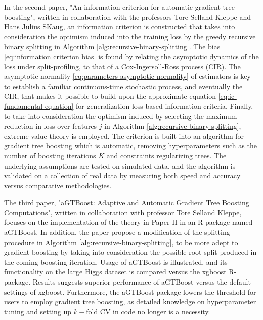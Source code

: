 In the second paper, "An information criterion for automatic gradient tree boosting", written in collaboration with the professors Tore Selland Kleppe and Hans Julius SKaug, an information criterion is constructed that takes into consideration the optimism induced into the training loss by the greedy recursive binary splitting in Algorithm \ref{alg:recursive-binary-splitting}.
The bias \eqref{eq:information criterion bias} is found by relating the asymptotic dynamics of the loss under split-profiling, to that of a Cox-Ingersoll-Ross process (CIR).
The asymptotic normality \eqref{eq:parameters-asymptotic-normality} of estimators is key to establish a familiar continuous-time stochastic process, and eventually the CIR, that makes it possible to build upon the approximate equation \eqref{eq:ic-fundamental-equation} for generalization-loss based information criteria.
Finally, to take into consideration the optimism induced by selecting the maximum reduction in loss over features $j$ in Algorithm \ref{alg:recursive-binary-splitting}, extreme-value theory is employed.
The criterion is built into an algorithm for gradient tree boosting which is automatic, removing hyperparameters such as the number of boosting iterations $K$ and constraints regularizing trees.
The underlying assumptions are tested on simulated data, and the algorithm is validated on a collection of real data by measuring both speed and accuracy versus comparative methodologies.


The third paper, "aGTBoost: Adaptive and Automatic Gradient Tree Boosting Computations", written in collaboration with professor Tore Selland Kleppe, focuses
on the implementation of the theory in Paper II in an R-package named aGTBoost. 
In addition, the paper propose a modification of the splitting procedure in Algorithm \ref{alg:recursive-binary-splitting}, to be more adept to gradient boosting by taking into consideration the possible root-split produced in the coming boosting iteration.
Usage of aGTBoost is illustrated, and its functionality on the large Higgs dataset is compared versus the xgboost R-package.
Results suggests superior performance of aGTBoost versus the default settings of xgboost.
Furthermore, the aGTBoost package lowers the threshold for users to employ gradient tree boosting, as detailed knowledge on hyperparameter tuning and setting up $k-$fold CV in code no longer is a necessity.



